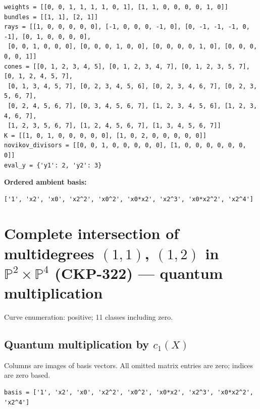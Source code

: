 \documentclass[10pt,a4paper]{article}
\begin{document}
\begin{lstlisting}
weights = [[0, 0, 1, 1, 1, 1, 0, 1], [1, 1, 0, 0, 0, 0, 1, 0]]
bundles = [[1, 1], [2, 1]]
rays = [[1, 0, 0, 0, 0, 0], [-1, 0, 0, 0, -1, 0], [0, -1, -1, -1, 0, -1], [0, 1, 0, 0, 0, 0],
 [0, 0, 1, 0, 0, 0], [0, 0, 0, 1, 0, 0], [0, 0, 0, 0, 1, 0], [0, 0, 0, 0, 0, 1]]
cones = [[0, 1, 2, 3, 4, 5], [0, 1, 2, 3, 4, 7], [0, 1, 2, 3, 5, 7], [0, 1, 2, 4, 5, 7],
 [0, 1, 3, 4, 5, 7], [0, 2, 3, 4, 5, 6], [0, 2, 3, 4, 6, 7], [0, 2, 3, 5, 6, 7],
 [0, 2, 4, 5, 6, 7], [0, 3, 4, 5, 6, 7], [1, 2, 3, 4, 5, 6], [1, 2, 3, 4, 6, 7],
 [1, 2, 3, 5, 6, 7], [1, 2, 4, 5, 6, 7], [1, 3, 4, 5, 6, 7]]
K = [[1, 0, 1, 0, 0, 0, 0, 0], [1, 0, 2, 0, 0, 0, 0, 0]]
novikov_divisors = [[0, 0, 1, 0, 0, 0, 0, 0], [1, 0, 0, 0, 0, 0, 0, 0]]
eval_y = {'y1': 2, 'y2': 3}
\end{lstlisting}

\textbf{Ordered ambient basis:}
\begin{lstlisting}
['1', 'x2', 'x0', 'x2^2', 'x0^2', 'x0*x2', 'x2^3', 'x0*x2^2', 'x2^4']
\end{lstlisting}

\clearpage\section*{Complete intersection of multidegrees $(1,1)$, $(1,2)$ in $\mathbb P^{2}\times \mathbb P^{4}$ (CKP-322) --- quantum multiplication}

Curve enumeration: positive; 11 classes including zero.
\subsection*{Quantum multiplication by $c_1(X)$}
Columns are images of basis vectors. All omitted matrix entries are zero; indices are zero based.

\begin{lstlisting}
basis = ['1', 'x2', 'x0', 'x2^2', 'x0^2', 'x0*x2', 'x2^3', 'x0*x2^2', 'x2^4']
\end{lstlisting}
\end{document}
